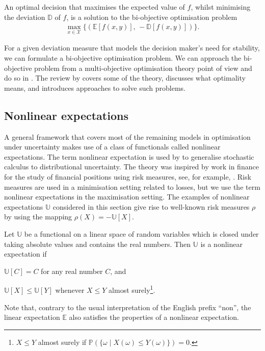 \documentclass[main.tex]{subfiles}
\begin{document}
\begin{problem}
  An optimal decision that maximises the expected value of $f$, whilst
  minimising the deviation $\mathbb{D}$ of $f$, is a solution to the
  bi-objective optimisation problem
  \begin{align}
    \max_{x\in\mathcal{X}}\{(\mathbb{E}[f(x,y)],\,-\mathbb{D}[f(x,y)])\}.
  \end{align}
\end{problem}
For a given deviation measure that models the decision maker's
need for stability, we can formulate a bi-objective optimisation
problem.
We can approach the bi-objective problem from a multi-objective
optimisation theory point of view and do so in
.
The review by \citet{marler2004survey} covers some of the theory,
discusses what optimality means, and introduces approaches to solve
such problems.


\subsection{Nonlinear expectations}\label{sec:nonlinear_expectations}
A general framework that covers most of the remaining models
in optimisation under uncertainty makes use of a class of functionals
called nonlinear expectations. The term nonlinear expectation is used
by \citet{peng2010nonlinear} to generalise stochastic calculus to
distributional uncertainty.
The theory was inspired by work in finance for the study of financial
positions using
risk measures, see,
for example, \citet[Ch.~4]{follmer2004stochastic}.
Risk measures are used in a minimisation setting related to losses,
but we use the term nonlinear expectations in the maximisation
setting. The examples of nonlinear expectations $\mathbb{U}$ considered
in this section give rise to well-known risk measures $\rho$ by using the mapping
$\rho(X) = -\mathbb{U}[X]$.

\begin{mydef}
  Let $\mathbb{U}$ be a functional on a linear space of random
  variables which is closed under taking absolute values and contains
  the real numbers.
  Then $\mathbb{U}$ is a nonlinear expectation if
  \begin{enumerate}
    \begin{samepage}
    \item $\mathbb{U}[C] = C$ for any real number $C$, and
    \item $\mathbb{U}[X]\leq \mathbb{U}[Y]$ whenever $X\leq Y$ almost
      surely\footnote{$X\leq Y$ almost surely if
        $\mathbb{P}(\{\omega\mid X(\omega)\leq Y(\omega)\})=0$.}.
    \end{samepage}
  \end{enumerate}
  Note that, contrary to the usual interpretation of the
  English prefix ``non'', the linear expectation $\mathbb{E}$ also satisfies
  the properties of a nonlinear expectation.
\end{mydef}
\end{document}
